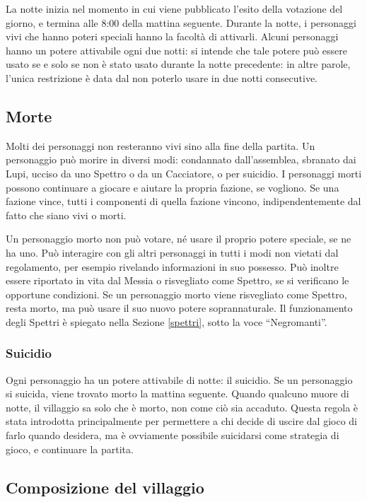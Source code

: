 \documentclass[a4paper,10pt]{article}
\begin{document}
La notte inizia nel momento in cui viene pubblicato l'esito della votazione del giorno, e termina alle 8:00 della mattina seguente.
Durante la notte, i personaggi vivi che hanno poteri speciali hanno la facoltà di attivarli.
Alcuni personaggi hanno un potere attivabile ogni due notti: si intende che tale potere può essere usato se e solo se non è stato usato durante la notte precedente: in altre parole, l'unica restrizione è data dal non poterlo usare in due notti consecutive.

\subsection{Morte}

Molti dei personaggi non resteranno vivi sino alla fine della partita. Un personaggio può morire in diversi modi: condannato dall'assemblea, sbranato dai Lupi, ucciso da uno Spettro o da un Cacciatore, o per suicidio.
I personaggi morti possono continuare a giocare e aiutare la propria fazione, se vogliono. Se una fazione vince, tutti i componenti di quella fazione vincono, indipendentemente dal fatto che siano vivi o morti.

Un personaggio morto non può votare, né usare il proprio potere speciale, se ne ha uno. Può interagire con gli altri personaggi in tutti i modi non vietati dal regolamento, per esempio rivelando informazioni in suo possesso. Può inoltre essere riportato in vita dal Messia o risvegliato come Spettro, se si verificano le opportune condizioni.
Se un personaggio morto viene risvegliato come Spettro, resta morto, ma può usare il suo nuovo potere soprannaturale. Il funzionamento degli Spettri è spiegato nella Sezione \ref{spettri}, sotto la voce ``Negromanti''.

\subsubsection{Suicidio}

Ogni personaggio ha un potere attivabile di notte: il suicidio.
Se un personaggio si suicida, viene trovato morto la mattina seguente. Quando qualcuno muore di notte, il villaggio sa solo che è morto, non come ciò sia accaduto.
Questa regola è stata introdotta principalmente per permettere a chi decide di uscire dal gioco di farlo quando desidera, ma è ovviamente possibile suicidarsi come strategia di gioco, e continuare la partita.


\subsection{Composizione del villaggio}
\end{document}
